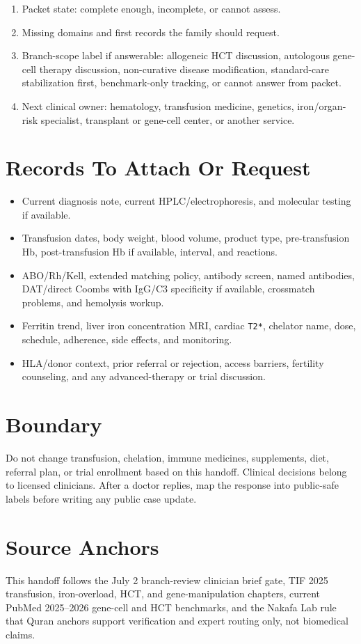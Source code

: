 \documentclass[11pt]{article}
\begin{document}
\begin{enumerate}
  \item Packet state: complete enough, incomplete, or cannot assess.
  \item Missing domains and first records the family should request.
  \item Branch-scope label if answerable: allogeneic HCT discussion,
  autologous gene-cell therapy discussion, non-curative disease modification,
  standard-care stabilization first, benchmark-only tracking, or cannot answer
  from packet.
  \item Next clinical owner: hematology, transfusion medicine, genetics,
  iron/organ-risk specialist, transplant or gene-cell center, or another
  service.
\end{enumerate}

\section*{Records To Attach Or Request}

\begin{itemize}
  \item Current diagnosis note, current HPLC/electrophoresis, and molecular
  testing if available.
  \item Transfusion dates, body weight, blood volume, product type,
  pre-transfusion Hb, post-transfusion Hb if available, interval, and
  reactions.
  \item ABO/Rh/Kell, extended matching policy, antibody screen, named
  antibodies, DAT/direct Coombs with IgG/C3 specificity if available,
  crossmatch problems, and hemolysis workup.
  \item Ferritin trend, liver iron concentration MRI, cardiac \texttt{T2*},
  chelator name, dose, schedule, adherence, side effects, and monitoring.
  \item HLA/donor context, prior referral or rejection, access barriers,
  fertility counseling, and any advanced-therapy or trial discussion.
\end{itemize}

\section*{Boundary}

Do not change transfusion, chelation, immune medicines, supplements, diet,
referral plan, or trial enrollment based on this handoff. Clinical decisions
belong to licensed clinicians. After a doctor replies, map the response into
public-safe labels before writing any public case update.

\section*{Source Anchors}

This handoff follows the July 2 branch-review clinician brief gate, TIF 2025
transfusion, iron-overload, HCT, and gene-manipulation chapters, current
PubMed 2025--2026 gene-cell and HCT benchmarks, and the Nakafa Lab rule that
Quran anchors support verification and expert routing only, not biomedical
claims.
\end{document}
